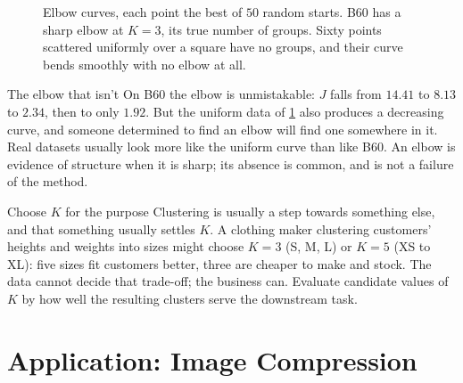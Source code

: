 \begin{figure}[htbp]
  \centering
  \caption{Elbow curves, each point the best of $50$ random starts. B60 has a
  sharp elbow at $K = 3$, its true number of groups. Sixty points scattered
  uniformly over a square have no groups, and their curve bends smoothly with no
  elbow at all.}
  \label{fig:elbow}
\end{figure}

\begin{pitfall}{The elbow that isn't}
On B60 the elbow is unmistakable: $J$ falls from $14.41$ to $8.13$ to $2.34$,
then to only $1.92$. But the uniform data of \cref{fig:elbow} also produces a
decreasing curve, and someone determined to find an elbow will find one
somewhere in it. Real datasets usually look more like the uniform curve than
like B60. An elbow is evidence of structure when it is sharp; its absence is
common, and is not a failure of the method.
\end{pitfall}

\begin{keyinsight}{Choose $K$ for the purpose}
Clustering is usually a step towards something else, and that something
usually settles $K$. A clothing maker clustering customers' heights and weights
into sizes might choose $K = 3$ (S, M, L) or $K = 5$ (XS to XL): five sizes fit
customers better, three are cheaper to make and stock. The data cannot decide
that trade-off; the business can. Evaluate candidate values of $K$ by how well the
resulting clusters serve the downstream task.
\end{keyinsight}

\section{Application: Image Compression}
\label{sec:compression}


